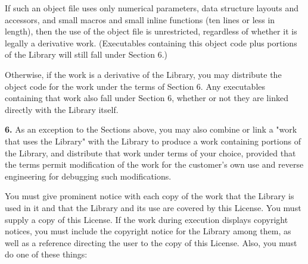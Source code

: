 If such an object file uses only numerical parameters, data structure layouts
and accessors, and small macros and small inline functions (ten lines or less
in length), then the use of the object file is unrestricted, regardless of
whether it is legally a derivative work. (Executables containing this object
code plus portions of the Library will still fall under Section 6.) 

Otherwise, if the work is a derivative of the Library, you may distribute the
object code for the work under the terms of Section 6. Any executables
containing that work also fall under Section 6, whether or not they are linked
directly with the Library itself. 

{\bf 6.} As an exception to the Sections above, you may also combine or link a
"work that uses the Library" with the Library to produce a work containing
portions of the Library, and distribute that work under terms of your choice,
provided that the terms permit modification of the work for the customer's own
use and reverse engineering for debugging such modifications. 

You must give prominent notice with each copy of the work that the Library is
used in it and that the Library and its use are covered by this License. You
must supply a copy of this License. If the work during execution displays
copyright notices, you must include the copyright notice for the Library among
them, as well as a reference directing the user to the copy of this License.
Also, you must do one of these things: 

